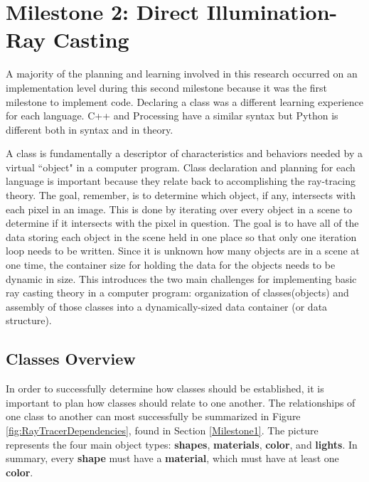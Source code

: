 \section{Milestone 2: Direct Illumination- Ray Casting}
A majority of the planning and learning involved in this research occurred on an implementation level during this second milestone because it was the first milestone to implement code.  Declaring a class was a different learning experience for each language.  C++ and Processing have a similar syntax but Python is different both in syntax and in theory.

A class is fundamentally a descriptor of characteristics and behaviors needed by a virtual ``object" in a computer program.  Class declaration and planning for each language is important because they relate back to accomplishing the ray-tracing theory. The goal, remember, is to determine which object, if any, intersects with each pixel in an image. This is done by iterating over every object in a scene to determine if it intersects with the pixel in question.  The goal is to have all of the data storing each object in the scene held in one place so that only one iteration loop needs to be written. Since it is unknown how many objects are in a scene at one time, the container size for holding the data for the objects needs to be dynamic in size.  This introduces the two main challenges for implementing basic ray casting theory in a computer program: organization of classes(objects) and assembly of those classes into a dynamically-sized data container (or data structure).
\subsection{Classes Overview}
In order to successfully determine how classes should be established, it is important to plan how classes should relate to one another.  The relationships of one class to another can most successfully be summarized in Figure \ref{fig:RayTracerDependencies}, found in Section \ref{Milestone1}.  The picture represents the four main object types: \textbf{shapes}, \textbf{materials}, \textbf{color}, and \textbf{lights}. In summary, every \textbf{shape} must have a \textbf{material}, which must have at least one \textbf{color}.

